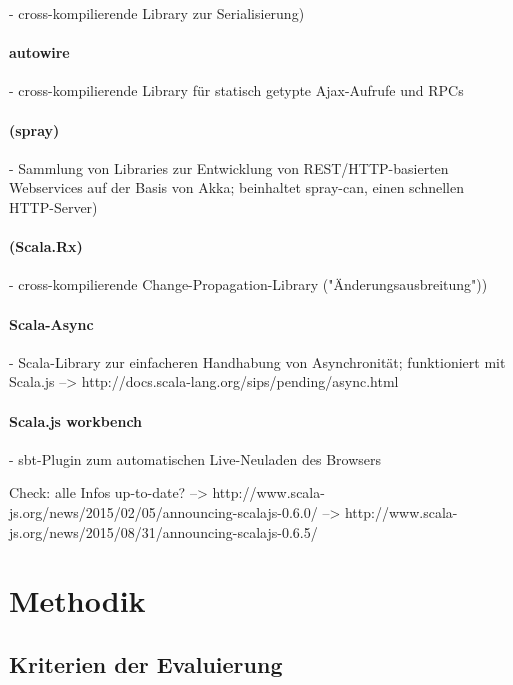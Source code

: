\documentclass[a4paper, 12pt, hidelinks, listof=totoc, listoftables=totoc, bibliography=totoc]{scrreprt}
\begin{document}
- cross-kompilierende Library zur Serialisierung)


\subsubsection{autowire}

- cross-kompilierende Library für statisch getypte Ajax-Aufrufe und RPCs

\subsubsection{(spray)}

- Sammlung von Libraries zur Entwicklung von REST/HTTP-basierten Webservices auf der Basis von Akka; beinhaltet spray-can, einen schnellen HTTP-Server)

\subsubsection{(Scala.Rx)}

- cross-kompilierende Change-Propagation-Library ("Änderungsausbreitung"))

\subsubsection{Scala-Async}

- Scala-Library zur einfacheren Handhabung von Asynchronität; funktioniert mit Scala.js -->  http://docs.scala-lang.org/sips/pending/async.html

\subsubsection{Scala.js workbench}

- sbt-Plugin zum automatischen Live-Neuladen des Browsers


Check: alle Infos up-to-date?
-->  http://www.scala-js.org/news/2015/02/05/announcing-scalajs-0.6.0/
-->  http://www.scala-js.org/news/2015/08/31/announcing-scalajs-0.6.5/





\chapter{Methodik}

\section{Kriterien der Evaluierung}
\end{document}
